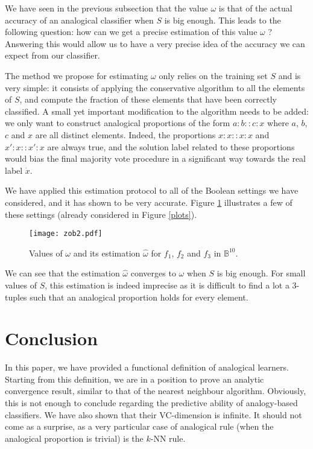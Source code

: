 \documentclass{ecai}
\begin{document}
We have seen in the previous subsection that the value $\omega$ is that of the actual
accuracy of an analogical classifier when $S$ is big enough. This leads to the
following question: how can we get a precise estimation of this value $\omega$
? Answering this would allow us to have a very precise idea of the accuracy we
can expect from our classifier.

The method we propose for estimating $\omega$ only relies on the training set $S$
and is very simple: it consists of applying the conservative algorithm to all
the elements of $S$, and compute the fraction of these elements that have been
correctly classified. A small yet important modification to the algorithm needs
to be added: we only want to construct analogical proportions of the form $a :
b :: c : x$ where $a$, $b$, $c$ and $x$ are all distinct elements. Indeed, the
proportions $x : x :: x : x$ and $x' : x :: x' : x$ are always true, and the
solution label related to these proportions would bias the final majority vote
procedure in a significant way towards the real label $\dot{x}$.

We have applied this estimation protocol to all of the Boolean settings we have
considered, and it has shown to be very accurate. Figure \ref{omegaplots}
illustrates a few of these settings (already considered in Figure \ref{plots}).
\begin{figure}
  \caption{Values of $\omega$ and its estimation $\hat{\omega}$ for $f_1$, $f_2$ and $f_3$ in
  $\mathbb{B}^{10}$.}
\label{omegaplots}
\texttt{[image: zob2.pdf]}
\end{figure}
We can see that the estimation $\hat{\omega}$ converges to $\omega$ when $S$ is
big enough. For small values of $S$, this estimation is indeed imprecise as it
is difficult to find a lot a 3-tuples such that an analogical proportion holds
for every element.

\section{Conclusion}\label{conc}

In this paper, we have provided a  functional definition of analogical
learners.  Starting from this definition, we are in a position to prove an
analytic convergence result, similar to that of the nearest neighbour
algorithm. Obviously, this is not enough to conclude regarding the predictive
ability of analogy-based classifiers. We have also shown that their
VC\mbox{-}dimension is infinite.  It should not come as a surprise, as a very
particular case of analogical rule (when the analogical proportion is trivial)
is the $k$-NN rule.
\end{document}
